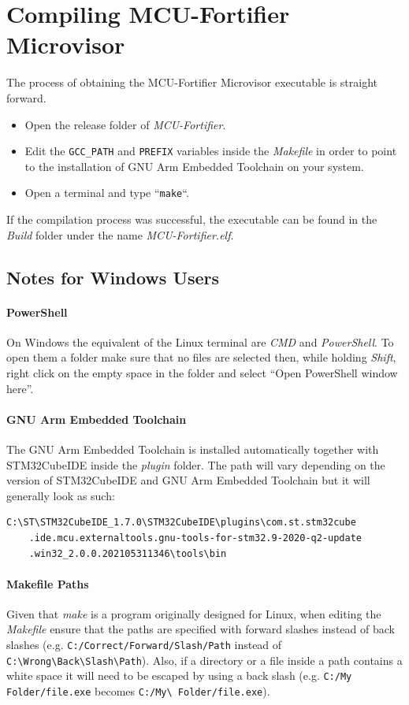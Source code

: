 \documentclass{article}
\begin{document}
\section{Compiling MCU-Fortifier Microvisor}
\label{sec:microvisor_compile}
The process of obtaining the MCU-Fortifier Microvisor executable is straight forward.
\begin{itemize}
    \item Open the release folder of \textit{MCU-Fortifier}.
    \item Edit the \verb|GCC_PATH| and \verb|PREFIX| variables inside the \textit{Makefile} in order to point to the installation of GNU Arm Embedded Toolchain on your system.
    \item Open a terminal and type ``\verb|make|``.
\end{itemize}
If the compilation process was successful, the executable can be found in the \textit{Build} folder under the name \textit{MCU-Fortifier.elf}.

\subsection{Notes for Windows Users}
\paragraph{PowerShell}
On Windows the equivalent of the Linux terminal are \textit{CMD} and \textit{PowerShell}. To open them a folder make sure that no files are selected then, while holding \textit{Shift}, right click on the empty space in the folder and select ``Open PowerShell window here''.

\paragraph{GNU Arm Embedded Toolchain}
The  GNU Arm Embedded Toolchain is installed automatically together with STM32CubeIDE inside the \textit{plugin} folder. The path will vary depending on the version of STM32CubeIDE and GNU Arm Embedded Toolchain but it will generally look as such:
\begin{verbatim}
C:\ST\STM32CubeIDE_1.7.0\STM32CubeIDE\plugins\com.st.stm32cube
    .ide.mcu.externaltools.gnu-tools-for-stm32.9-2020-q2-update
    .win32_2.0.0.202105311346\tools\bin
\end{verbatim}

\paragraph{Makefile Paths}
Given that \textit{make} is a program originally designed for Linux, when editing the \textit{Makefile} ensure that the paths are specified with forward slashes instead of back slashes (e.g. \verb|C:/Correct/Forward/Slash/Path| instead of \verb|C:\Wrong\Back\Slash\Path|). Also, if a directory or a file inside a path contains a white space it will need to be escaped by using a back slash (e.g. \verb|C:/My Folder/file.exe| becomes \verb|C:/My\ Folder/file.exe|).
\end{document}
